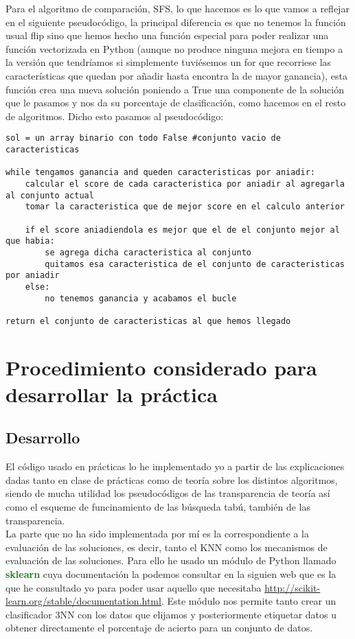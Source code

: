 \documentclass[10pt,a4paper]{article}
\begin{document}
Para el algoritmo de comparación, SFS, lo que hacemos es lo que vamos a reflejar en el siguiente pseudocódigo, la principal diferencia es que no tenemos la función usual flip sino que hemos hecho una función especial para poder realizar una función vectorizada en Python (aunque no produce ninguna mejora en tiempo a la versión que tendríamos si simplemente tuviésemos un for que recorriese las características que quedan por añadir hasta encontra la de mayor ganancia), esta función crea una nueva solución poniendo a True una componente de la solución que le pasamos y nos da su porcentaje de clasificación, como hacemos en el resto de algoritmos. Dicho esto pasamos al pseudocódigo:

\begin{lstlisting}
sol = un array binario con todo False #conjunto vacio de caracteristicas

while tengamos ganancia and queden caracteristicas por aniadir:
	calcular el score de cada caracteristica por aniadir al agregarla al conjunto actual
	tomar la caracteristica que de mejor score en el calculo anterior
	
	if el score aniadiendola es mejor que el de el conjunto mejor al que habia:
		se agrega dicha caracteristica al conjunto
		quitamos esa caracteristica de el conjunto de caracteristicas por aniadir
	else:
		no tenemos ganancia y acabamos el bucle
		
return el conjunto de caracteristicas al que hemos llegado
\end{lstlisting}
\newpage
\section{\color[rgb]{0.0,0.0,0.21}Procedimiento considerado para desarrollar la práctica}

\subsection{\color[rgb]{0.0,0.0,0.51}Desarrollo}

El código usado en prácticas lo he implementado yo a partir de las explicaciones dadas tanto en clase de prácticas como de teoría sobre los distintos algoritmos, siendo de mucha utilidad los pseudocódigos de las transparencia de teoría así como el esqueme de funcinamiento de las búsqueda tabú, también de las transparencia.\\

La parte que no ha sido implementada por mí es la correspondiente a la evaluación de las soluciones, es decir, tanto el KNN como los mecanismos de evaluación de las soluciones. Para ello he usado un módulo de Python llamado \textbf{\textcolor{green}{sklearn}} cuya documentación la podemos consultar en la siguien web que es la que he consultado yo para poder usar aquello que necesitaba \url{http://scikit-learn.org/stable/documentation.html}. Este módulo nos permite tanto crear un clasificador 3NN con los datos que elijamos y posteriormente etiquetar datos u obtener directamente el porcentaje de acierto para un conjunto de datos.\\
\end{document}
